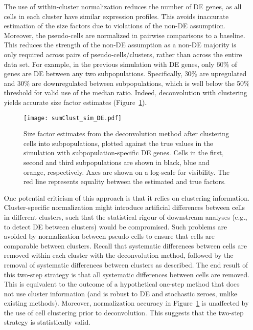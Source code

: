 \documentclass{article}
\begin{document}
The use of within-cluster normalization reduces the number of DE genes, as all cells in each cluster have similar expression profiles.
This avoids inaccurate estimation of the size factors due to violations of the non-DE assumption.
Moreover, the pseudo-cells are normalized in pairwise comparisons to a baseline.
This reduces the strength of the non-DE assumption as a non-DE majority is only required across pairs of pseudo-cells/clusters, rather than across the entire data set.
For example, in the previous simulation with DE genes, only 60\% of genes are DE between any two subpopulations.
Specifically, 30\% are upregulated and 30\% are downregulated between subpopulations, which is well below the 50\% threshold for valid use of the median ratio.
Indeed, deconvolution with clustering yields accurate size factor estimates (Figure~\ref{fig:sim_cluster_DE}).

\begin{figure}[bt]
    \begin{center}
        \texttt{[image: sumClust\_sim\_DE.pdf]}
    \end{center}
    \caption{
        Size factor estimates from the deconvolution method after clustering cells into subpopulations, 
            plotted against the true values in the simulation with subpopulation-specific DE genes.
        Cells in the first, second and third subpopulations are shown in black, blue and orange, respectively.
        Axes are shown on a log-scale for visibility.
        The red line represents equality between the estimated and true factors.
    }
    \label{fig:sim_cluster_DE}
\end{figure}

One potential criticism of this approach is that it relies on clustering information.
Cluster-specific normalization might introduce artificial differences between cells in different clusters, 
    such that the statistical rigour of downstream analyses (e.g., to detect DE between clusters) would be compromised.
Such problems are avoided by normalization between pseudo-cells to ensure that cells are comparable between clusters.
Recall that systematic differences between cells are removed within each cluster with the deconvolution method, 
    followed by the removal of systematic differences between clusters as described.
The end result of this two-step strategy is that all systematic differences between cells are removed.
This is equivalent to the outcome of a hypothetical one-step method that does not use cluster information (and is robust to DE and stochastic zeroes, unlike existing methods).
Moreover, normalization accuracy in Figure~\ref{fig:sim_cluster_DE} is unaffected by the use of cell clustering prior to deconvolution.
This suggests that the two-step strategy is statistically valid.
\end{document}
